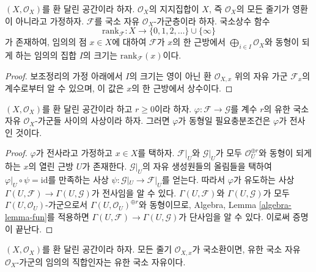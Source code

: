 \begin{lemma}
\label{lemma-rank}
$(X, \mathcal{O}_X)$를 환 달린 공간이라 하자.
$\mathcal{O}_X$의 지지집합이 $X$, 즉 $\mathcal{O}_X$의 모든 줄기가
영환이 아니라고 가정하자. $\mathcal{F}$를 국소 자유
$\mathcal{O}_X$-가군층이라 하자. 국소상수 함수
$$
\text{rank}_\mathcal{F} :
X \longrightarrow \{0, 1, 2, \ldots\}\cup\{\infty\}
$$
가 존재하여, 임의의 점 $x \in X$에 대하여 $\mathcal{F}$가
$x$의 한 근방에서 $\bigoplus_{i\in I} \mathcal{O}_X$와 동형이 되게 하는
임의의 집합 $I$의 크기는 $\text{rank}_\mathcal{F}(x)$이다.
\end{lemma}

\begin{proof}
보조정리의 가정 아래에서 $I$의 크기는 영이 아닌 환
$\mathcal{O}_{X, x}$ 위의 자유 가군 $\mathcal{F}_x$의 계수로부터
알 수 있으며, 이 값은 $x$의 한 근방에서 상수이다.
\end{proof}

\begin{lemma}
\label{lemma-map-finite-locally-free}
$(X, \mathcal{O}_X)$를 환 달린 공간이라 하고 $r \geq 0$이라 하자.
$\varphi : \mathcal{F} \to \mathcal{G}$를 계수 $r$의 유한 국소 자유
$\mathcal{O}_X$-가군들 사이의 사상이라 하자. 그러면 $\varphi$가
동형일 필요충분조건은 $\varphi$가 전사인 것이다.
\end{lemma}

\begin{proof}
$\varphi$가 전사라고 가정하고 $x \in X$를 택하자.
$\mathcal{F}|_U$와 $\mathcal{G}|_U$가 모두
$\mathcal{O}_U^{\oplus r}$와 동형이 되게 하는 $x$의 열린 근방 $U$가 존재한다.
$\mathcal{G}|_U$의 자유 생성원들의 올림들을 택하여
$\varphi|_U \circ \psi = \text{id}$를 만족하는 사상
$\psi : \mathcal{G}|_U \to \mathcal{F}|_U$를 얻는다.
따라서 $\varphi$가 유도하는 사상
$\Gamma(U, \mathcal{F}) \to \Gamma(U, \mathcal{G})$가 전사임을 알 수 있다.
$\Gamma(U, \mathcal{F})$와 $\Gamma(U, \mathcal{G})$가 모두
$\Gamma(U, \mathcal{O}_U)$-가군으로서
$\Gamma(U, \mathcal{O}_U)^{\oplus r}$와 동형이므로, Algebra, Lemma
\ref{algebra-lemma-fun}를 적용하면
$\Gamma(U, \mathcal{F}) \to \Gamma(U, \mathcal{G})$가 단사임을 알 수 있다.
이로써 증명이 끝난다.
\end{proof}

\begin{lemma}
\label{lemma-direct-summand-of-locally-free-is-locally-free}
$(X, \mathcal{O}_X)$를 환 달린 공간이라 하자. 모든 줄기
$\mathcal{O}_{X, x}$가 국소환이면, 유한 국소 자유 $\mathcal{O}_X$-가군의
임의의 직합인자는 유한 국소 자유이다.
\end{lemma}

